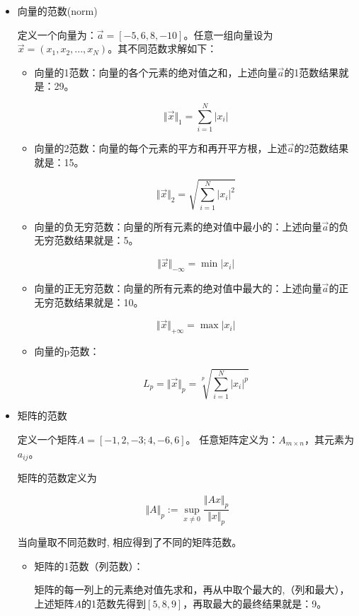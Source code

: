 \begin{itemize}\itemsep0em

		\item 向量的范数(norm)

			定义一个向量为：$\vec{a}=[-5, 6, 8, -10]$。任意一组向量设为$\vec{x}=(x_1,x_2,...,x_N)$。其不同范数求解如下：

		\begin{itemize}\itemsep0em
				\item 向量的1范数：向量的各个元素的绝对值之和，上述向量$\vec{a}$的1范数结果就是：29。

					$$
				\Vert\vec{x}\Vert_1=\sum_{i=1}^N\vert{x_i}\vert
				$$

			\item 向量的2范数：向量的每个元素的平方和再开平方根，上述$\vec{a}$的2范数结果就是：15。

				$$
				\Vert\vec{x}\Vert_2=\sqrt{\sum_{i=1}^N{\vert{x_i}\vert}^2}
				$$

			\item 向量的负无穷范数：向量的所有元素的绝对值中最小的：上述向量$\vec{a}$的负无穷范数结果就是：5。  

				$$
				\Vert\vec{x}\Vert_{-\infty}=\min{|{x_i}|}
				$$

			\item 向量的正无穷范数：向量的所有元素的绝对值中最大的：上述向量$\vec{a}$的正无穷范数结果就是：10。 

				$$
				\Vert\vec{x}\Vert_{+\infty}=\max{|{x_i}|}
				$$
			\item 向量的p范数：

				$$
				L_p=\Vert\vec{x}\Vert_p=\sqrt[p]{\sum_{i=1}^{N}|{x_i}|^p}
				$$

		\end{itemize}


	\item 矩阵的范数

		定义一个矩阵$A=[-1, 2, -3; 4, -6, 6]$。 任意矩阵定义为：$A_{m\times n}$，其元素为 $a_{ij}$。

		矩阵的范数定义为

			$$
			\Vert{A}\Vert_p :=\sup_{x\neq 0}\frac{\Vert{Ax}\Vert_p}{\Vert{x}\Vert_p}
			$$

		当向量取不同范数时, 相应得到了不同的矩阵范数。


	\begin{itemize}\itemsep0em
			\item 矩阵的1范数（列范数）：

				矩阵的每一列上的元素绝对值先求和，再从中取个最大的,（列和最大），上述矩阵$A$的1范数先得到$[5,8,9]$，再取最大的最终结果就是：9。


\end{itemize}
\end{itemize}
